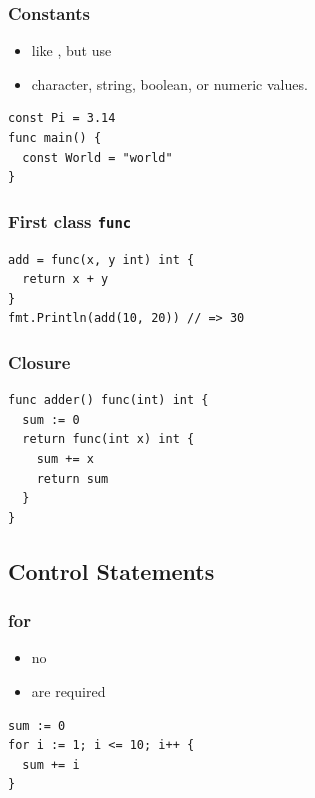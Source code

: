 \documentclass[xetex,mathserif,serif,12pt]{beamer}
\begin{document}
\begin{frame}[fragile]
  \frametitle{Constants}

  \begin{itemize}
  \item like , but use 
  \item character, string, boolean, or numeric values.
  \end{itemize}

  \begin{beamer@nomargin}
    \begin{lstlisting}
const Pi = 3.14
func main() {
  const World = "world"
}
    \end{lstlisting}
  \end{beamer@nomargin}
\end{frame}

\begin{frame}[fragile]
  \frametitle{First class \texttt{func}}

  \begin{beamer@nomargin}
    \begin{lstlisting}
add = func(x, y int) int {
  return x + y
}
fmt.Println(add(10, 20)) // => 30
    \end{lstlisting}
  \end{beamer@nomargin}
\end{frame}

\begin{frame}[fragile]
  \frametitle{Closure}

  \begin{beamer@nomargin}
    \begin{lstlisting}
func adder() func(int) int {
  sum := 0
  return func(int x) int {
    sum += x
    return sum
  }
}
    \end{lstlisting}
  \end{beamer@nomargin}
\end{frame}

\subsection{Control Statements}

\begin{frame}[fragile]
  \frametitle{\ttfamily for}

  \begin{itemize}
  \item no \hltexttt{(} \hltexttt{)}
  \item \hltexttt{\{} \hltexttt{\}} are required
  \end{itemize}

  \begin{beamer@nomargin}
    \begin{lstlisting}
sum := 0
for i := 1; i <= 10; i++ {
  sum += i
}
    \end{lstlisting}
  \end{beamer@nomargin}
\end{frame}
\end{document}
